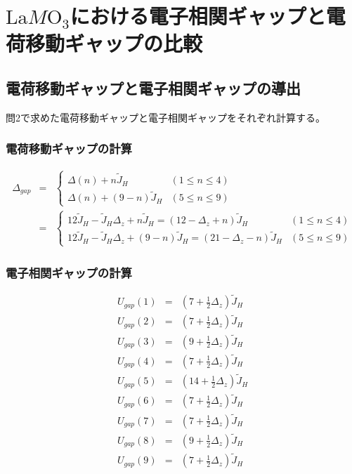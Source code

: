 \documentclass{jsarticle}
\begin{document}
\section{$\mathrm{La}M\mathrm{O_3}$における電子相関ギャップと電荷移動ギャップの比較}
\subsection{電荷移動ギャップと電子相関ギャップの導出}
問2で求めた電荷移動ギャップと電子相関ギャップをそれぞれ計算する。\\
\subsubsection{電荷移動ギャップの計算}
\begin{eqnarray}
  \Delta _{gap}
  &=& \left\{ \begin{array}{ll}
    \Delta(n) + n \tilde{J}_H & (1 \leq n \leq 4) \\
    \Delta(n) + (9 - n) \tilde{J}_H & (5 \leq n \leq 9)
  \end{array} \right. \nonumber \\
  &=& \left\{ \begin{array}{ll}
    12 \tilde{J}_H - \tilde{J}_H \Delta _z + n \tilde{J}_H = (12 - \Delta _z + n) \tilde{J}_H & (1 \leq n \leq 4) \\
    12 \tilde{J}_H - \tilde{J}_H \Delta _z + (9 - n) \tilde{J}_H = (21 - \Delta _z -n) \tilde{J}_H & (5 \leq n \leq 9)
  \end{array} \right. \nonumber
\end{eqnarray}
\subsubsection{電子相関ギャップの計算}
\begin{eqnarray}
  U_{gap}(1) &=& (7 + \frac{1}{2} \Delta _z)\tilde{J}_H \nonumber \\
  U_{gap}(2) &=& (7 + \frac{1}{2} \Delta _z)\tilde{J}_H \nonumber \\
  U_{gap}(3) &=& (9 + \frac{1}{2} \Delta _z)\tilde{J}_H \nonumber \\
  U_{gap}(4) &=& (7 + \frac{1}{2} \Delta _z)\tilde{J}_H \nonumber \\
  U_{gap}(5) &=& (14 + \frac{1}{2} \Delta _z)\tilde{J}_H \nonumber \\
  U_{gap}(6) &=& (7 + \frac{1}{2} \Delta _z)\tilde{J}_H \nonumber \\
  U_{gap}(7) &=& (7 + \frac{1}{2} \Delta _z)\tilde{J}_H \nonumber \\
  U_{gap}(8) &=& (9 + \frac{1}{2} \Delta _z)\tilde{J}_H \nonumber \\
  U_{gap}(9) &=& (7 + \frac{1}{2} \Delta _z)\tilde{J}_H \nonumber
\end{eqnarray}
\end{document}
